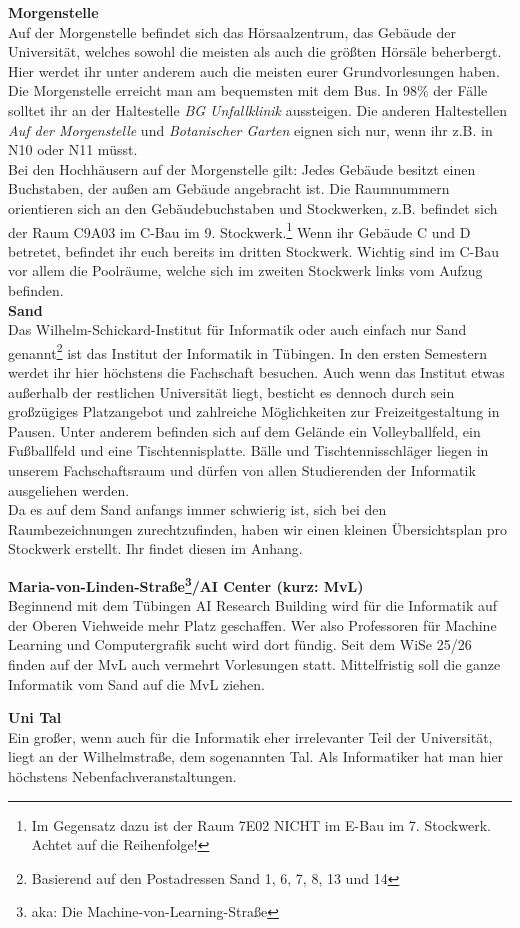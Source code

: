 \textbf{Morgenstelle}\\
Auf der Morgenstelle befindet sich das Hörsaalzentrum, das Gebäude der Universität, welches sowohl die meisten als auch die größten Hörsäle beherbergt. Hier werdet ihr unter anderem auch die meisten eurer Grundvorlesungen haben.\\
Die Morgenstelle erreicht man am bequemsten mit dem Bus. In 98\% der Fälle solltet ihr an der Haltestelle \emph{BG Unfallklinik} aussteigen. Die anderen Haltestellen \emph{Auf der Morgenstelle} und \emph{Botanischer Garten} eignen sich nur, wenn ihr z.B. in N10 oder N11 müsst.\\ Bei den Hochhäusern auf der Morgenstelle gilt: Jedes Gebäude besitzt einen Buchstaben, der außen am Gebäude angebracht ist.  Die Raumnummern orientieren sich an den Gebäudebuchstaben und Stockwerken, z.B. befindet sich der Raum C9A03 im C-Bau im 9. Stockwerk.\footnote{Im Gegensatz dazu ist der Raum 7E02 NICHT im E-Bau im 7. Stockwerk. Achtet auf die Reihenfolge!} Wenn ihr Gebäude C und D betretet, befindet ihr euch bereits im dritten Stockwerk. Wichtig sind im C-Bau vor allem die Poolräume, welche sich im zweiten Stockwerk links vom Aufzug befinden. \\
\newpage
\textbf{Sand}\\
Das Wilhelm-Schickard-Institut für Informatik oder auch einfach nur Sand genannt\footnote{Basierend auf den Postadressen Sand 1, 6, 7, 8, 13 und 14} ist das Institut der Informatik in Tübingen. In den ersten Semestern werdet ihr hier höchstens die Fachschaft besuchen. Auch wenn das Institut etwas außerhalb der restlichen Universität liegt, besticht es dennoch durch sein großzügiges Platzangebot und zahlreiche Möglichkeiten zur Freizeitgestaltung in Pausen. Unter anderem befinden sich auf dem Gelände ein Volleyballfeld, ein Fußballfeld und eine Tischtennisplatte. Bälle und Tischtennisschläger liegen in unserem Fachschaftsraum und dürfen von allen Studierenden der Informatik ausgeliehen werden.\\
Da es auf dem Sand anfangs immer schwierig ist, sich bei den Raumbezeichnungen zurechtzufinden, haben wir einen kleinen Übersichtsplan pro Stockwerk erstellt. Ihr findet diesen im Anhang.

\textbf{Maria-von-Linden-Straße\footnote{aka: Die Machine-von-Learning-Straße}/AI Center (kurz: MvL)}\\
Beginnend mit dem Tübingen AI Research Building wird für die Informatik auf der Oberen Viehweide mehr Platz geschaffen. Wer also Professoren für Machine Learning und Computergrafik sucht wird dort fündig.
Seit dem WiSe 25/26 finden auf der MvL auch vermehrt Vorlesungen statt. Mittelfristig soll die ganze Informatik vom Sand auf die MvL ziehen.

\textbf{Uni Tal}\\
Ein großer, wenn auch für die Informatik eher irrelevanter Teil der Universität, liegt an der Wilhelmstraße, dem sogenannten Tal. Als Informatiker hat man hier höchstens Nebenfachveranstaltungen.
\vfill
